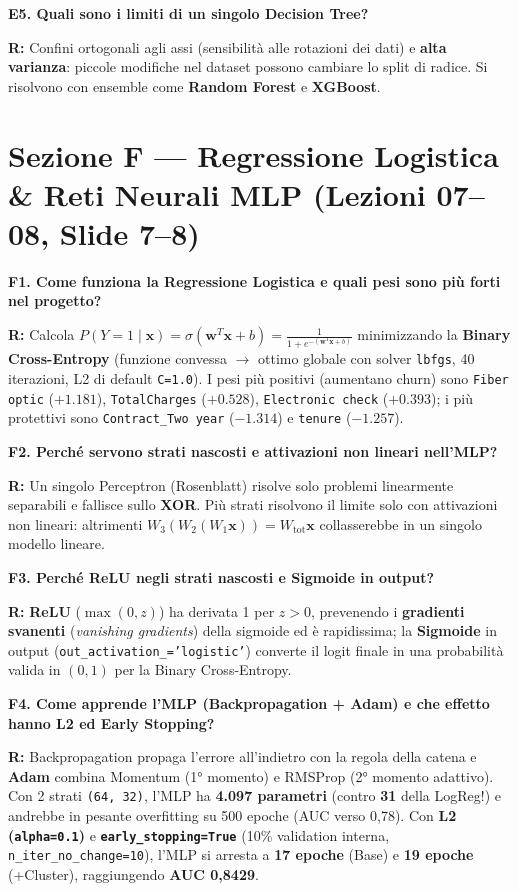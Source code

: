 \documentclass[10pt, a4paper]{article}
\newcommand{\qa}[2]{%
  \par\vspace{4pt}\noindent\textbf{\color{PrimaryNavy}#1}\par\vspace{1pt}%
  \noindent\textbf{\color{SecondaryBlue}R:} #2\par\vspace{2pt}%
}
\begin{document}
\qa{E5. Quali sono i limiti di un singolo Decision Tree?}{
Confini ortogonali agli assi (sensibilità alle rotazioni dei dati) e \textbf{alta varianza}: piccole modifiche nel dataset possono cambiare lo split di radice. Si risolvono con ensemble come \textbf{Random Forest} e \textbf{XGBoost}.}

\section*{Sezione F --- Regressione Logistica \& Reti Neurali MLP (Lezioni 07--08, Slide 7--8)}

\qa{F1. Come funziona la Regressione Logistica e quali pesi sono più forti nel progetto?}{
Calcola $P(Y=1 \mid \mathbf{x}) = \sigma(\mathbf{w}^T\mathbf{x} + b) = \frac{1}{1+e^{-(\mathbf{w}^T\mathbf{x}+b)}}$ minimizzando la \textbf{Binary Cross-Entropy} (funzione convessa $\rightarrow$ ottimo globale con solver \texttt{lbfgs}, 40 iterazioni, L2 di default \texttt{C=1.0}). I pesi più positivi (aumentano churn) sono \texttt{Fiber optic} ($+1.181$), \texttt{TotalCharges} ($+0.528$), \texttt{Electronic check} ($+0.393$); i più protettivi sono \texttt{Contract\_Two year} ($-1.314$) e \texttt{tenure} ($-1.257$).}

\qa{F2. Perché servono strati nascosti e attivazioni non lineari nell'MLP?}{
Un singolo Perceptron (Rosenblatt) risolve solo problemi linearmente separabili e fallisce sullo \textbf{XOR}. Più strati risolvono il limite solo con attivazioni non lineari: altrimenti $W_3(W_2(W_1\mathbf{x})) = W_{\text{tot}}\mathbf{x}$ collasserebbe in un singolo modello lineare.}

\qa{F3. Perché ReLU negli strati nascosti e Sigmoide in output?}{
\textbf{ReLU} ($\max(0,z)$) ha derivata 1 per $z>0$, prevenendo i \textbf{gradienti svanenti} (\textit{vanishing gradients}) della sigmoide ed è rapidissima; la \textbf{Sigmoide} in output (\texttt{out\_activation\_='logistic'}) converte il logit finale in una probabilità valida in $(0,1)$ per la Binary Cross-Entropy.}

\qa{F4. Come apprende l'MLP (Backpropagation + Adam) e che effetto hanno L2 ed Early Stopping?}{
Backpropagation propaga l'errore all'indietro con la regola della catena e \textbf{Adam} combina Momentum (1° momento) e RMSProp (2° momento adattivo). Con 2 strati \texttt{(64, 32)}, l'MLP ha \textbf{4.097 parametri} (contro \textbf{31} della LogReg!) e andrebbe in pesante overfitting su 500 epoche (AUC verso 0,78). Con \textbf{L2 (\texttt{alpha=0.1})} e \textbf{\texttt{early\_stopping=True}} (10\% validation interna, \texttt{n\_iter\_no\_change=10}), l'MLP si arresta a \textbf{17 epoche} (Base) e \textbf{19 epoche} (+Cluster), raggiungendo \textbf{AUC 0,8429}.}
\end{document}
